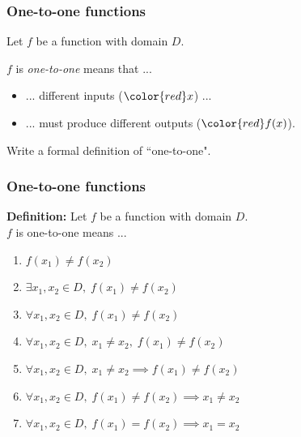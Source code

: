 \begin{frame}
	\frametitle{One-to-one functions}

	Let $f$ be a function with domain $D$. \\

	\vfill

	$f$ is \emph{one-to-one} means that ...
	\begin{itemize}
		\item ... different inputs (${\color{red} x}$) ...

		\item ... must produce different outputs (${\color{red} f(x)}$).
	\end{itemize}

	\vfill

	\begin{block}{}
		Write a formal definition of ``one-to-one".
	\end{block}
\end{frame}

\begin{frame}
	\frametitle{One-to-one functions}

	{\bfseries Definition:} Let $f$ be a function with domain $D$. \\ $f$ is one-to-one
	means ...
	\begin{enumerate}
		\item $\displaystyle f(x_{1}) \neq f(x_{2})$

		\item $\displaystyle \exists x_{1}, x_{2}\in D, \; f(x_{1}) \neq f(x_{2})$

		\item $\displaystyle \forall x_{1}, x_{2}\in D, \; f(x_{1}) \neq f(x_{2})$

		\item $\displaystyle \forall x_{1}, x_{2}\in D, \; x_{1}\neq x_{2}, \; f(x_{1}
			) \neq f(x_{2})$

		\item $\displaystyle \forall x_{1}, x_{2}\in D, \; x_{1}\neq x_{2}\implies f(
			x_{1}) \neq f(x_{2})$

		\item $\displaystyle \forall x_{1}, x_{2}\in D, \; f(x_{1}) \neq f(x_{2}) \implies
			x_{1}\neq x_{2}$

		\item $\displaystyle \forall x_{1}, x_{2}\in D, \; f(x_{1}) = f(x_{2}) \implies
			x_{1}= x_{2}$
	\end{enumerate}
\end{frame}

